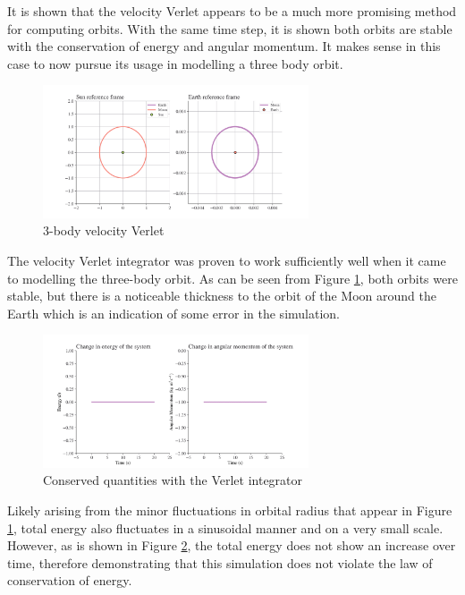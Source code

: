 \documentclass[11pt, english]{report}
\begin{document}
\normalsize{\noindent
It is shown that the velocity Verlet appears to be a much more promising method for computing orbits. With the same time step, it is shown both orbits are stable with the conservation of energy and angular momentum. It makes sense in this case to now pursue its usage in modelling a three body orbit.
}

\begin{figure}[ht]
    \centering
    \includegraphics[width=0.7\textwidth]{graphics/3b_verlet.png}
    \caption{3-body velocity Verlet}
    \label{fig:3b_verlet}
\end{figure}

\normalsize{The velocity Verlet integrator was proven to work sufficiently well when it came to modelling the three-body orbit. As can be seen from Figure \ref{fig:3b_verlet}, both orbits were stable, but there is a noticeable thickness to the orbit of the Moon around the Earth which is an indication of some error in the simulation.
\begin{figure}[ht]
    \centering
    \includegraphics[width=0.7\textwidth]{graphics/3b_conservation.png}
    \caption{Conserved quantities with the Verlet integrator}
    \label{fig:3b_conservation}
\end{figure}

Likely arising from the minor fluctuations in orbital radius that appear in Figure \ref{fig:3b_verlet}, total energy also fluctuates in a sinusoidal manner and on a very small scale. However, as is shown in Figure \ref{fig:3b_conservation}, the total energy does not show an increase over time, therefore demonstrating that this simulation does not violate the law of conservation of energy.}
\end{document}
